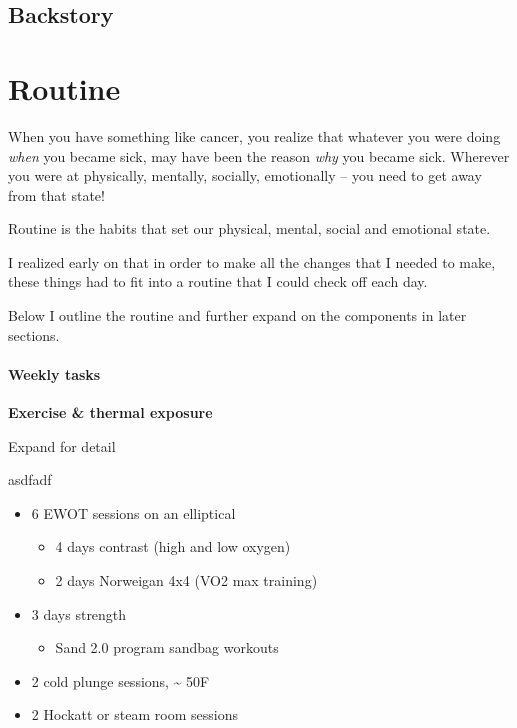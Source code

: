 \documentclass[
  letterpaper,
  DIV=11,
  numbers=noendperiod]{scrreprt}
\providecommand{\tightlist}{%
  \setlength{\itemsep}{0pt}\setlength{\parskip}{0pt}}\usepackage{longtable,booktabs,array}
\begin{document}
\chapter{Backstory}\label{backstory}

\part{Routine}

When you have something like cancer, you realize that whatever you were
doing \emph{when} you became sick, may have been the reason \emph{why}
you became sick. Wherever you were at physically, mentally, socially,
emotionally -- you need to get away from that state!

Routine is the habits that set our physical, mental, social and
emotional state.

I realized early on that in order to make all the changes that I needed
to make, these things had to fit into a routine that I could check off
each day.

Below I outline the routine and further expand on the components in
later sections.

\subsection*{Weekly tasks}\label{weekly-tasks}

\textbf{Exercise \& thermal exposure}

Expand for detail

asdfadf

\begin{itemize}
\item
  6 EWOT sessions on an elliptical

  \begin{itemize}
  \item
    4 days contrast (high and low oxygen)
  \item
    2 days Norweigan 4x4 (VO2 max training)
  \end{itemize}
\item
  3 days strength

  \begin{itemize}
  \tightlist
  \item
    Sand 2.0 program sandbag workouts
  \end{itemize}
\item
  2 cold plunge sessions, \textasciitilde{} 50F
\item
  2 Hockatt or steam room sessions
\end{itemize}
\end{document}
